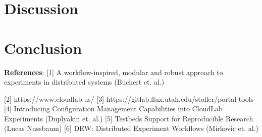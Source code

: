 \documentclass[11pt,twocolumn,letterpaper]{article}
\begin{document}
\section{Discussion}

\section{Conclusion}

\textbf{References}:
    [1] A workflow-inspired, modular and robust approach to experiments in distributed systems (Buchert et. al.)

    [2] https://www.cloudlab.us/
    [3] https://gitlab.flux.utah.edu/stoller/portal-tools
    [4] Introducing Configuration Management Capabilities into CloudLab Experiments (Duplyakin et. al.)
    [5] Testbeds Support for Reproducible Research (Lucas Nussbaum)
    [6] DEW: Distributed Experiment Workflows (Mirkovic et. al.)
\end{document}
